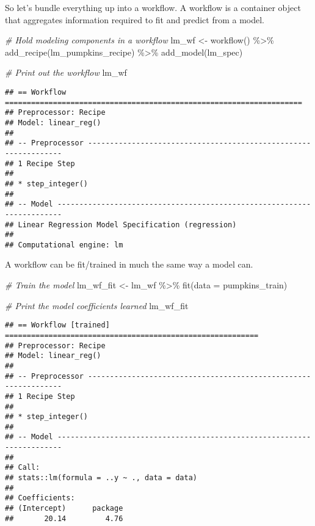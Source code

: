 \documentclass[
]{article}
\newenvironment{Shaded}{\begin{snugshade}}{\end{snugshade}}
\newcommand{\AttributeTok}[1]{\textcolor[rgb]{0.77,0.63,0.00}{#1}}
\newcommand{\CommentTok}[1]{\textcolor[rgb]{0.56,0.35,0.01}{\textit{#1}}}
\newcommand{\FunctionTok}[1]{\textcolor[rgb]{0.00,0.00,0.00}{#1}}
\newcommand{\NormalTok}[1]{#1}
\newcommand{\OtherTok}[1]{\textcolor[rgb]{0.56,0.35,0.01}{#1}}
\newcommand{\SpecialCharTok}[1]{\textcolor[rgb]{0.00,0.00,0.00}{#1}}
\begin{document}
So let's bundle everything up into a workflow. A workflow is a container
object that aggregates information required to fit and predict from a
model.

\begin{Shaded}
\begin{Highlighting}[]
\CommentTok{\# Hold modeling components in a workflow}
\NormalTok{lm\_wf }\OtherTok{\textless{}{-}} \FunctionTok{workflow}\NormalTok{() }\SpecialCharTok{\%\textgreater{}\%} 
  \FunctionTok{add\_recipe}\NormalTok{(lm\_pumpkins\_recipe) }\SpecialCharTok{\%\textgreater{}\%} 
  \FunctionTok{add\_model}\NormalTok{(lm\_spec)}

\CommentTok{\# Print out the workflow}
\NormalTok{lm\_wf}
\end{Highlighting}
\end{Shaded}

\begin{verbatim}
## == Workflow ====================================================================
## Preprocessor: Recipe
## Model: linear_reg()
## 
## -- Preprocessor ----------------------------------------------------------------
## 1 Recipe Step
## 
## * step_integer()
## 
## -- Model -----------------------------------------------------------------------
## Linear Regression Model Specification (regression)
## 
## Computational engine: lm
\end{verbatim}

A workflow can be fit/trained in much the same way a model can.

\begin{Shaded}
\begin{Highlighting}[]
\CommentTok{\# Train the model}
\NormalTok{lm\_wf\_fit }\OtherTok{\textless{}{-}}\NormalTok{ lm\_wf }\SpecialCharTok{\%\textgreater{}\%} 
  \FunctionTok{fit}\NormalTok{(}\AttributeTok{data =}\NormalTok{ pumpkins\_train)}

\CommentTok{\# Print the model coefficients learned }
\NormalTok{lm\_wf\_fit}
\end{Highlighting}
\end{Shaded}

\begin{verbatim}
## == Workflow [trained] ==========================================================
## Preprocessor: Recipe
## Model: linear_reg()
## 
## -- Preprocessor ----------------------------------------------------------------
## 1 Recipe Step
## 
## * step_integer()
## 
## -- Model -----------------------------------------------------------------------
## 
## Call:
## stats::lm(formula = ..y ~ ., data = data)
## 
## Coefficients:
## (Intercept)      package  
##       20.14         4.76
\end{verbatim}
\end{document}
